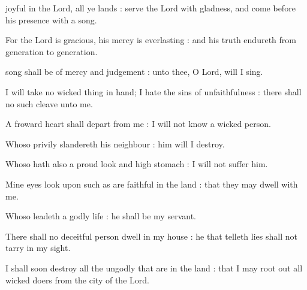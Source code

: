 
 joyful in the Lord, all ye lands : serve the Lord with gladness, and come before his presence with a song.\par
{}
For the Lord is gracious, his mercy is everlasting : and his truth endureth from generation to generation.\par


 song shall be of mercy and judgement : unto thee, O Lord, will I sing.\par
{}
I will take no wicked thing in hand; I hate the sins of unfaithfulness : there shall no such cleave unto me.\par
{}A froward heart shall depart from me : I will not know a wicked person.\par
{}Whoso privily slandereth his neighbour : him will I destroy.\par
{}Whoso hath also a proud look and high stomach : I will not suffer him.\par
{}Mine eyes look upon such as are faithful in the land : that they may dwell with me.\par
{}Whoso leadeth a godly life : he shall be my servant.\par
{}There shall no deceitful person dwell in my house : he that telleth lies shall not tarry in my sight.\par
{}I shall soon destroy all the ungodly that are in the land : that I may root out all wicked doers from the city of the Lord.\par



